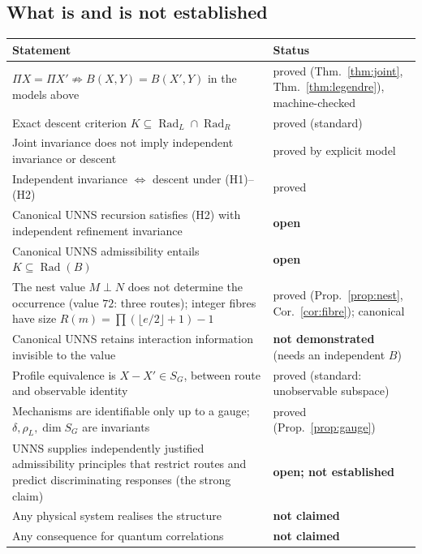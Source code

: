 \documentclass[11pt,a4paper]{article}
\newcommand{\Rad}{\operatorname{Rad}}
\newcommand{\defic}{\delta}
\theoremstyle{plain}
\theoremstyle{definition}
\begin{document}
\subsection{What is and is not established}
\begin{center}\small
\begin{tabularx}{\textwidth}{@{}>{\raggedright\arraybackslash}X>{\raggedright\arraybackslash}p{}@{}}
\toprule
Statement & Status\\
\midrule
$\Pi X=\Pi X'\not\Rightarrow B(X,Y)=B(X',Y)$ in the models above & proved (Thm.~\ref{thm:joint}, Thm.~\ref{thm:legendre}), machine-checked\\
Exact descent criterion $K\subseteq\Rad_L\cap\Rad_R$ & proved (standard)\\
Joint invariance does not imply independent invariance or descent & proved by explicit model\\
Independent invariance $\Leftrightarrow$ descent under (H1)--(H2) & proved\\
Canonical UNNS recursion satisfies (H2) with independent refinement invariance & \textbf{open}\\
Canonical UNNS admissibility entails $K\subseteq\Rad(B)$ & \textbf{open}\\
The nest value $M\perp N$ does not determine the occurrence (value $72$: three routes); integer fibres have size $R(m)=\prod(\lfloor e/2\rfloor+1)-1$ & proved (Prop.~\ref{prop:nest}, Cor.~\ref{cor:fibre}); canonical\\
Canonical UNNS retains interaction information invisible to the value & \textbf{not demonstrated} (needs an independent $B$)\\
Profile equivalence is $X-X'\in S_G$, between route and observable identity & proved (standard: unobservable subspace)\\
Mechanisms are identifiable only up to a gauge; $\defic,\rho_L,\dim S_G$ are invariants & proved (Prop.~\ref{prop:gauge})\\
UNNS supplies independently justified admissibility principles that restrict routes and predict discriminating responses (the strong claim) & \textbf{open; not established}\\
Any physical system realises the structure & \textbf{not claimed}\\
Any consequence for quantum correlations & \textbf{not claimed}\\
\bottomrule
\end{tabularx}
\end{center}
\end{document}
